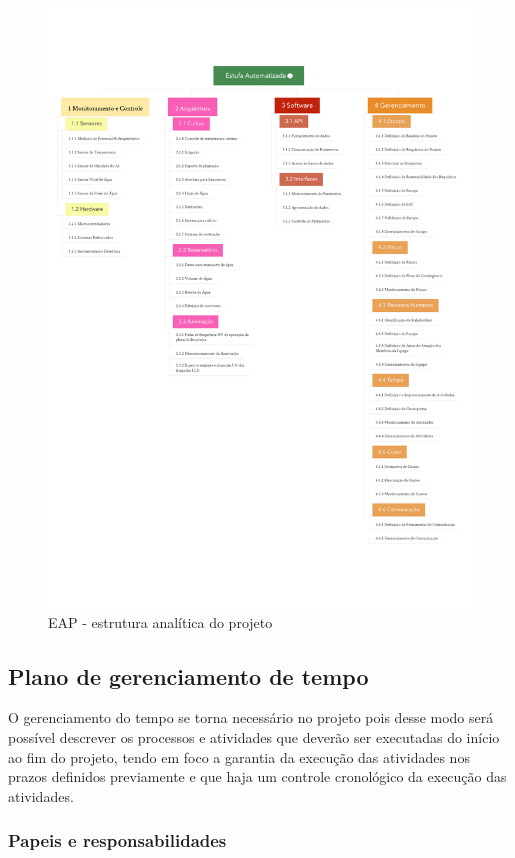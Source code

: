 \begin{figure}[H]
	\centering
	\includegraphics[width=15cm]{figuras/eap.pdf}
	\caption{EAP - estrutura analítica do projeto} \label{eap}
\end{figure}

\subsection{Plano de gerenciamento de tempo}

O gerenciamento do tempo se torna necessário no projeto pois desse modo será possível descrever os processos e atividades que deverão ser executadas do início ao fim do projeto, tendo em foco a garantia da execução das atividades nos prazos definidos previamente e que haja um controle cronológico da execução das atividades.

\subsubsection{Papeis e responsabilidades}

